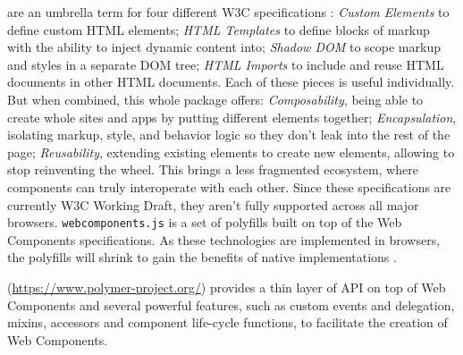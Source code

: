 \begin{description}
\itemsep1pt\parskip0pt

\item[Web Components] are an umbrella term for four different W3C specifications \cite{w3c}:
\emph{Custom Elements} to define custom HTML elements;
\emph{HTML Templates} to define blocks of markup with the ability to inject dynamic content into;
\emph{Shadow DOM} to scope markup and styles in a separate DOM tree;
\emph{HTML Imports} to include and reuse HTML documents in other HTML documents.
Each of these pieces is useful individually. But when combined, this whole package offers:
\emph{Composability}, being able to create whole sites and apps by putting different elements together;
\emph{Encapsulation}, isolating markup, style, and behavior logic so they don't leak into the rest of the page;
\emph{Reusability}, extending existing elements to create new elements, allowing to stop reinventing the wheel.
This brings a less fragmented ecosystem, where components can truly interoperate with each other.
Since these specifications are currently W3C Working Draft, they aren't fully supported across all major browsers. \texttt{webcomponents.js} is a set of polyfills built on top of the Web Components specifications. 
As these technologies are implemented in browsers, the polyfills will shrink to gain the benefits of native implementations \cite{webcomponents-polyfills}. 
        
\item[Polymer library] (\url{https://www.polymer-project.org/}) provides a thin layer of API on top of Web Components and several powerful features, such as custom events and delegation, mixins, accessors and component life-cycle functions, to facilitate the creation of Web Components. 
\end{description}


 
